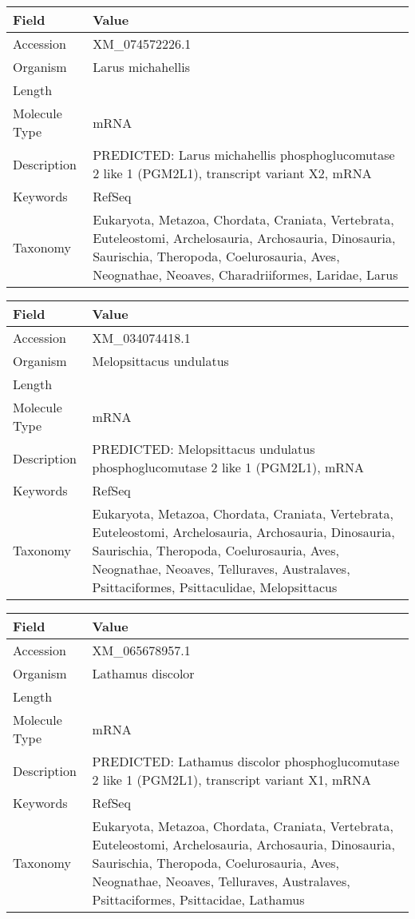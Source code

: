 \documentclass[10pt]{article}
\begin{document}
{\footnotesize
\begin{longtable}{>{\raggedright\arraybackslash}p{4.5cm} >{\raggedright\arraybackslash}p{11.5cm}}
\textbf{Field} & \textbf{Value} \\
\hline
Accession & XM\_074572226.1 \\
Organism & Larus michahellis \\
Length & 3260 \\
Molecule Type & mRNA \\
Description & PREDICTED: Larus michahellis phosphoglucomutase 2 like 1 (PGM2L1), transcript variant X2, mRNA \\
Keywords & RefSeq \\
Taxonomy & Eukaryota, Metazoa, Chordata, Craniata, Vertebrata, Euteleostomi, Archelosauria, Archosauria, Dinosauria, Saurischia, Theropoda, Coelurosauria, Aves, Neognathae, Neoaves, Charadriiformes, Laridae, Larus \\
\end{longtable}
}

{\footnotesize
\begin{longtable}{>{\raggedright\arraybackslash}p{4.5cm} >{\raggedright\arraybackslash}p{11.5cm}}
\textbf{Field} & \textbf{Value} \\
\hline
Accession & XM\_034074418.1 \\
Organism & Melopsittacus undulatus \\
Length & 2949 \\
Molecule Type & mRNA \\
Description & PREDICTED: Melopsittacus undulatus phosphoglucomutase 2 like 1 (PGM2L1), mRNA \\
Keywords & RefSeq \\
Taxonomy & Eukaryota, Metazoa, Chordata, Craniata, Vertebrata, Euteleostomi, Archelosauria, Archosauria, Dinosauria, Saurischia, Theropoda, Coelurosauria, Aves, Neognathae, Neoaves, Telluraves, Australaves, Psittaciformes, Psittaculidae, Melopsittacus \\
\end{longtable}
}

{\footnotesize
\begin{longtable}{>{\raggedright\arraybackslash}p{4.5cm} >{\raggedright\arraybackslash}p{11.5cm}}
\textbf{Field} & \textbf{Value} \\
\hline
Accession & XM\_065678957.1 \\
Organism & Lathamus discolor \\
Length & 6388 \\
Molecule Type & mRNA \\
Description & PREDICTED: Lathamus discolor phosphoglucomutase 2 like 1 (PGM2L1), transcript variant X1, mRNA \\
Keywords & RefSeq \\
Taxonomy & Eukaryota, Metazoa, Chordata, Craniata, Vertebrata, Euteleostomi, Archelosauria, Archosauria, Dinosauria, Saurischia, Theropoda, Coelurosauria, Aves, Neognathae, Neoaves, Telluraves, Australaves, Psittaciformes, Psittacidae, Lathamus \\
\end{longtable}
}
\end{document}
